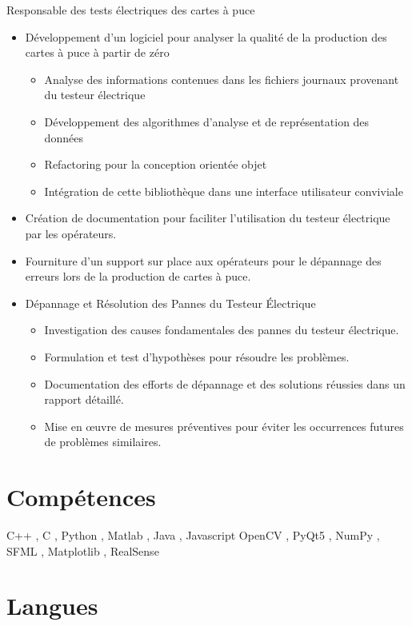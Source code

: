 \documentclass[11pt,a4paper]{moderncv}
\begin{document}
    {
    Responsable des tests électriques des cartes à puce 
    \begin{itemize}
        \setlength{\itemindent}{1cm}
        \item Développement d'un logiciel pour analyser la qualité de la production des cartes à puce à partir de zéro
        \begin{itemize}
            \setlength{\itemindent}{1.5cm}
            \item Analyse des informations contenues dans les fichiers journaux provenant du testeur électrique
            \item Développement des algorithmes d'analyse et de représentation des données
            \item Refactoring pour la conception orientée objet
            \item Intégration de cette bibliothèque dans une interface utilisateur conviviale
        \end{itemize}
        \item Création de documentation pour faciliter l'utilisation du testeur électrique par les opérateurs. 
        \item Fourniture d'un support sur place aux opérateurs pour le dépannage des erreurs lors de la production de cartes à puce.
        \item Dépannage et Résolution des Pannes du Testeur Électrique
        \begin{itemize}
            \setlength{\itemindent}{1.5cm}
            \item Investigation des causes fondamentales des pannes du testeur électrique.
            \item Formulation et test d'hypothèses pour résoudre les problèmes.
            \item Documentation des efforts de dépannage et des solutions réussies dans un rapport détaillé.
            \item Mise en œuvre de mesures préventives pour éviter les occurrences futures de problèmes similaires.
        \end{itemize}
    \end{itemize}
    }
    
\section{Compétences}

    {C++ , C  , Python  , Matlab  , Java  , Javascript  }
    {OpenCV  , PyQt5  , NumPy  , SFML  , Matplotlib , RealSense }

\section{Langues}
\end{document}
